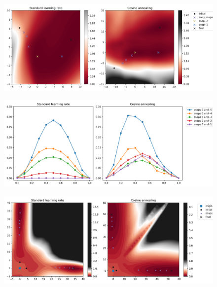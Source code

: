 \begin{figure}
	\centering
	\includegraphics[width=1\linewidth]{./figs/planes.png}  
	\caption{}
	\label{}
\end{figure}

\begin{figure}
	\centering
	\includegraphics[width=1\linewidth]{./figs/line_plots.png}  
	\caption{}
	\label{}
\end{figure}

\begin{figure}
	\centering
	\includegraphics[width=1\linewidth]{./figs/origin_planes.png}  
	\caption{}
	\label{}
\end{figure}




	
\printbibliography[heading=bibintoc,title={References}]
	
